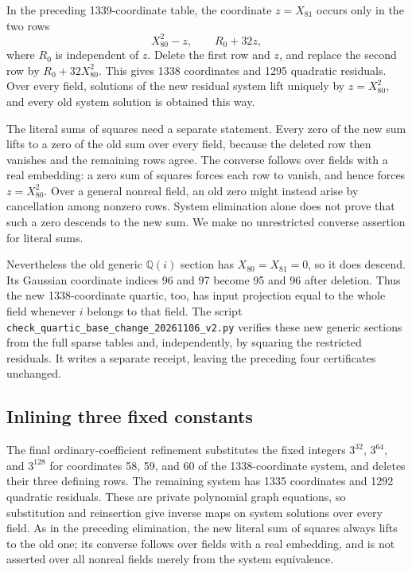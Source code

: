 \documentclass[11pt]{article}
\theoremstyle{definition}
\begin{document}
In the preceding 1339-coordinate table, the coordinate
$z=X_{81}$ occurs only in the two rows
\[
                       X_{80}^2-z,
                         \qquad R_0+32z,
\]
where $R_0$ is independent of $z$.  Delete the first row and
$z$, and replace the second row by $R_0+32X_{80}^2$.
This gives 1338 coordinates and 1295 quadratic residuals.
Over every field, solutions of the new residual system lift
uniquely by $z=X_{80}^2$, and every old system solution is
obtained this way.

The literal sums of squares need a separate statement.
Every zero of the new sum lifts to a zero of the old sum
over every field, because the deleted row then vanishes and
the remaining rows agree.  The converse follows over fields
with a real embedding: a zero sum of squares forces each
row to vanish, and hence forces $z=X_{80}^2$.  Over a
general nonreal field, an old zero might instead arise by
cancellation among nonzero rows.  System elimination alone
does not prove that such a zero descends to the new sum.
We make no unrestricted converse assertion for literal sums.

Nevertheless the old generic $\mathbb Q(i)$ section has
$X_{80}=X_{81}=0$, so it does descend.  Its Gaussian
coordinate indices 96 and 97 become 95 and 96 after deletion.
Thus the new 1338-coordinate quartic, too, has input
projection equal to the whole field whenever $i$ belongs
to that field.  The script
\nolinkurl{check_quartic_base_change_20261106_v2.py}
verifies these new generic sections from the full sparse
tables and, independently, by squaring the restricted
residuals.  It writes a separate receipt, leaving the
preceding four certificates unchanged.

\subsection{Inlining three fixed constants}

The final ordinary-coefficient refinement substitutes the fixed
integers $3^{32}$, $3^{64}$, and $3^{128}$ for coordinates
58, 59, and 60 of the 1338-coordinate system, and deletes
their three defining rows.  The remaining system has 1335
coordinates and 1292 quadratic residuals.  These are private
polynomial graph equations, so substitution and reinsertion
give inverse maps on system solutions over every field.
As in the preceding elimination, the new literal sum of
squares always lifts to the old one; its converse follows
over fields with a real embedding, and is not asserted over
all nonreal fields merely from the system equivalence.
\end{document}
